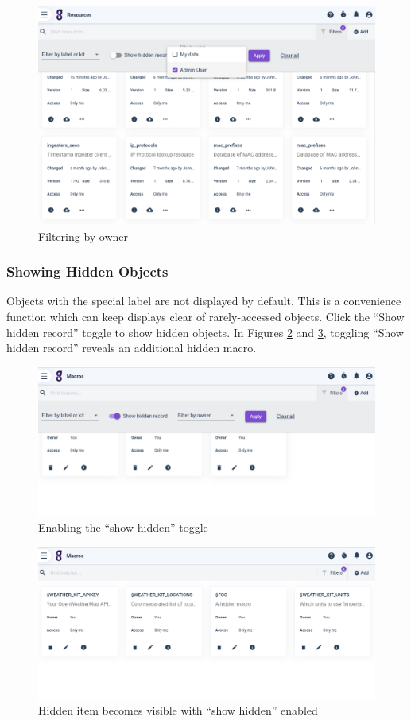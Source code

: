 \begin{figure}
	\includegraphics[width=0.8\linewidth]{images/filter-owner.png}
	\caption{Filtering by owner}
	\label{fig:filter-owner}
\end{figure}

\subsubsection{Showing Hidden Objects}

Objects with the special label  are not displayed by default. This is a convenience function which can keep displays clear of rarely-accessed objects. Click the ``Show hidden record'' toggle to show hidden objects. In Figures \ref{fig:filter-hidden} and \ref{fig:filter-hidden-applied}, toggling ``Show hidden record'' reveals an additional hidden macro.

\begin{figure}
	\includegraphics[width=0.6\linewidth]{images/filter-hidden.png}
	\caption{Enabling the ``show hidden'' toggle}
	\label{fig:filter-hidden}
\end{figure}

\begin{figure}
	\includegraphics[width=0.6\linewidth]{images/filter-hidden-applied.png}
	\caption{Hidden item becomes visible with ``show hidden'' enabled}
	\label{fig:filter-hidden-applied}
\end{figure}

